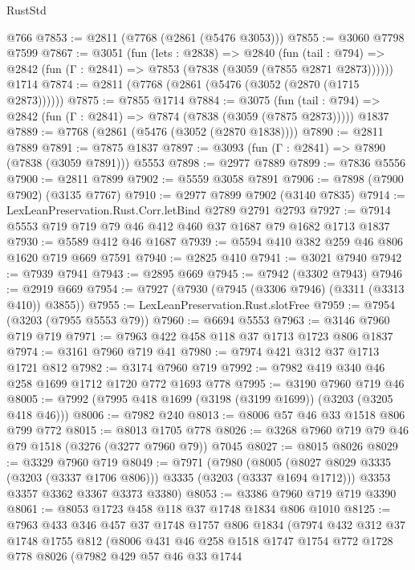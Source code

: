 \begin{lexlean}{RustStd}
\begin{coremodule}
{\begin{coremodule}
{{{{{{{{{{{{{{{    @766
@7853 := @2811 (@7768 (@2861 (@5476 @3053)))
@7855 := @3060 @7798 @7599
@7867 := @3051
    (fun (lets : @2838) =>
    @2840
      (fun (tail : @794) => @2842 (fun (Γ : @2841) => @7853 (@7838 (@3059 (@7855 @2871 @2873))))))
    @1714
@7874 := @2811 (@7768 (@2861 (@5476 (@3052 (@2870 (@1715 @2873))))))
@7875 := @7855 @1714
@7884 := @3075
    (fun (tail : @794) => @2842 (fun (Γ : @2841) => @7874 (@7838 (@3059 (@7875 @2873)))))
    @1837
@7889 := @7768 (@2861 (@5476 (@3052 (@2870 @1838))))
@7890 := @2811 @7889
@7891 := @7875 @1837
@7897 := @3093 (fun (Γ : @2841) => @7890 (@7838 (@3059 @7891))) @5553
@7898 := @2977 @7889
@7899 := @7836 @5556
@7900 := @2811 @7899
@7902 := @5559 @3058 @7891
@7906 := @7898 (@7900 @7902) (@3135 @7767)
@7910 := @2977 @7899 @7902 (@3140 @7835)
@7914 := LexLeanPreservation.Rust.Corr.letBind @2789 @2791 @2793
@7927 := @7914 @5553 @719 @719 @79 @46 @412 @460 @37 @1687 @79 @1682 @1713 @1837
@7930 := @5589 @412 @46 @1687
@7939 := @5594 @410 @382 @259 @46 @806 @1620 @719 @669 @7591
@7940 := @2825 @410
@7941 := @3021 @7940
@7942 := @7939 @7941
@7943 := @2895 @669
@7945 := @7942 (@3302 @7943)
@7946 := @2919 @669
@7954 := @7927 (@7930 (@7945 (@3306 @7946) (@3311 (@3313 @410)) @3855))
@7955 := LexLeanPreservation.Rust.slotFree
@7959 := @7954 (@3203 (@7955 @5553 @79))
@7960 := @6694 @5553
@7963 := @3146 @7960 @719 @719
@7971 := @7963 @422 @458 @118 @37 @1713 @1723 @806 @1837
@7974 := @3161 @7960 @719 @41
@7980 := @7974 @421 @312 @37 @1713 @1721 @812
@7982 := @3174 @7960 @719
@7992 := @7982 @419 @340 @46 @258 @1699 @1712 @1720 @772 @1693 @778
@7995 := @3190 @7960 @719 @46
@8005 := @7992 (@7995 @418 @1699 (@3198 (@3199 @1699)) (@3203 (@3205 @418 @46)))
@8006 := @7982 @240
@8013 := @8006 @57 @46 @33 @1518 @806 @799 @772
@8015 := @8013 @1705 @778
@8026 := @3268 @7960 @719 @79 @46 @79 @1518 (@3276 (@3277 @7960 @79)) @7045
@8027 := @8015 @8026
@8029 := @3329 @7960 @719
@8049 := @7971
    (@7980
      (@8005 (@8027 @8029 @3335 (@3203 (@3337 @1706 @806))) @3335 (@3203 (@3337 @1694 @1712)))
      @3353
      @3357
      @3362
      @3367
      @3373
      @3380)
@8053 := @3386 @7960 @719 @719 @3390
@8061 := @8053 @1723 @458 @118 @37 @1748 @1834 @806 @1010
@8125 := @7963
    @433
    @346
    @457
    @37
    @1748
    @1757
    @806
    @1834
    (@7974
      @432
      @312
      @37
      @1748
      @1755
      @812
      (@8006
        @431
        @46
        @258
        @1518
        @1747
        @1754
        @772
        @1728
        @778
        @8026
        (@7982
          @429
          @57
          @46
          @33
          @1744
}}}}}}}}}}}}}}}
\end{coremodule}}
\end{coremodule}
\end{lexlean}
